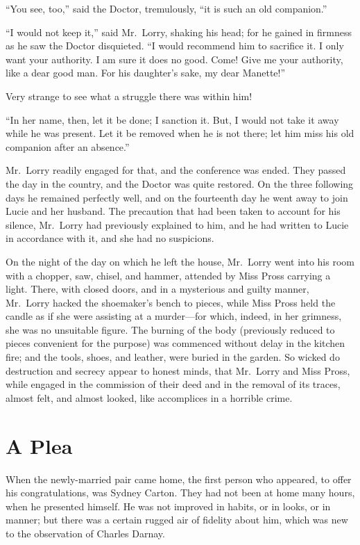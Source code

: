 ``You see, too,'' said the Doctor, tremulously, ``it is such an
old companion.''

``I would not keep it,'' said Mr.\ Lorry, shaking his head; for he gained
in firmness as he saw the Doctor disquieted.  ``I would recommend him
to sacrifice it.  I only want your authority.  I am sure it does no
good.  Come!  Give me your authority, like a dear good man.  For his
daughter's sake, my dear Manette!''

Very strange to see what a struggle there was within him!

``In her name, then, let it be done; I sanction it.  But, I would not
take it away while he was present.  Let it be removed when he is not
there; let him miss his old companion after an absence.''

Mr.\ Lorry readily engaged for that, and the conference was ended.
They passed the day in the country, and the Doctor was quite restored.
On the three following days he remained perfectly well, and on the
fourteenth day he went away to join Lucie and her husband.  The
precaution that had been taken to account for his silence, Mr.\ Lorry
had previously explained to him, and he had written to Lucie in
accordance with it, and she had no suspicions.

On the night of the day on which he left the house, Mr.\ Lorry went
into his room with a chopper, saw, chisel, and hammer, attended by
Miss Pross carrying a light.  There, with closed doors, and in a
mysterious and guilty manner, Mr.\ Lorry hacked the shoemaker's bench
to pieces, while Miss Pross held the candle as if she were assisting
at a murder---for which, indeed, in her grimness, she was no unsuitable
figure.  The burning of the body (previously reduced to pieces
convenient for the purpose) was commenced without delay in the kitchen
fire; and the tools, shoes, and leather, were buried in the garden.
So wicked do destruction and secrecy appear to honest minds, that
Mr.\ Lorry and Miss Pross, while engaged in the commission of their
deed and in the removal of its traces, almost felt, and almost looked,
like accomplices in a horrible crime.



\chapter{A Plea}


When the newly-married pair came home, the first person who appeared,
to offer his congratulations, was Sydney Carton.  They had not been
at home many hours, when he presented himself.  He was not improved in
habits, or in looks, or in manner; but there was a certain rugged air of
fidelity about him, which was new to the observation of Charles Darnay.

